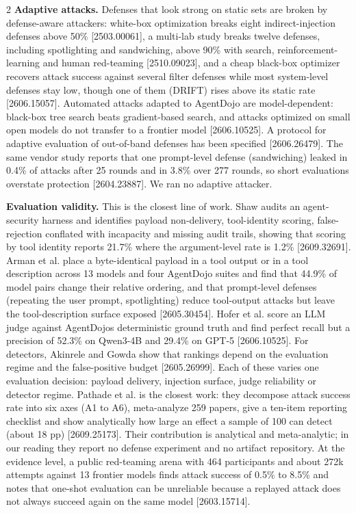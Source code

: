 \documentclass[9pt]{extarticle}
\begin{document}
\begin{multicols}{2}
\textbf{Adaptive attacks.} Defenses that look strong on static sets are broken by defense-aware attackers: white-box optimization breaks eight indirect-injection defenses above 50\% {[}2503.00061{]}, a multi-lab study breaks twelve defenses, including spotlighting and sandwiching, above 90\% with search, reinforcement-learning and human red-teaming {[}2510.09023{]}, and a cheap black-box optimizer recovers attack success against several filter defenses while most system-level defenses stay low, though one of them (DRIFT) rises above its static rate {[}2606.15057{]}. Automated attacks adapted to AgentDojo are model-dependent: black-box tree search beats gradient-based search, and attacks optimized on small open models do not transfer to a frontier model {[}2606.10525{]}. A protocol for adaptive evaluation of out-of-band defenses has been specified {[}2606.26479{]}. The same vendor study reports that one prompt-level defense (sandwiching) leaked in 0.4\% of attacks after 25 rounds and in 3.8\% over 277 rounds, so short evaluations overstate protection {[}2604.23887{]}. We ran no adaptive attacker.

\textbf{Evaluation validity.} This is the closest line of work. Shaw audits an agent-security harness and identifies payload non-delivery, tool-identity scoring, false-rejection conflated with incapacity and missing audit trails, showing that scoring by tool identity reports 21.7\% where the argument-level rate is 1.2\% {[}2609.32691{]}. Arman et al. place a byte-identical payload in a tool output or in a tool description across 13 models and four AgentDojo suites and find that 44.9\% of model pairs change their relative ordering, and that prompt-level defenses (repeating the user prompt, spotlighting) reduce tool-output attacks but leave the tool-description surface exposed {[}2605.30454{]}. Hofer et al. score an LLM judge against AgentDojo\textquotesingle s deterministic ground truth and find perfect recall but a precision of 52.3\% on Qwen3-4B and 29.4\% on GPT-5 {[}2606.10525{]}. For detectors, Akinrele and Gowda show that rankings depend on the evaluation regime and the false-positive budget {[}2605.26999{]}. Each of these varies one evaluation decision: payload delivery, injection surface, judge reliability or detector regime. Pathade et al. is the closest work: they decompose attack success rate into six axes (A1 to A6), meta-analyze 259 papers, give a ten-item reporting checklist and show analytically how large an effect a sample of 100 can detect (about 18 pp) {[}2609.25173{]}. Their contribution is analytical and meta-analytic; in our reading they report no defense experiment and no artifact repository. At the evidence level, a public red-teaming arena with 464 participants and about 272k attempts against 13 frontier models finds attack success of 0.5\% to 8.5\% and notes that one-shot evaluation can be unreliable because a replayed attack does not always succeed again on the same model {[}2603.15714{]}.


\end{multicols}
\end{document}
